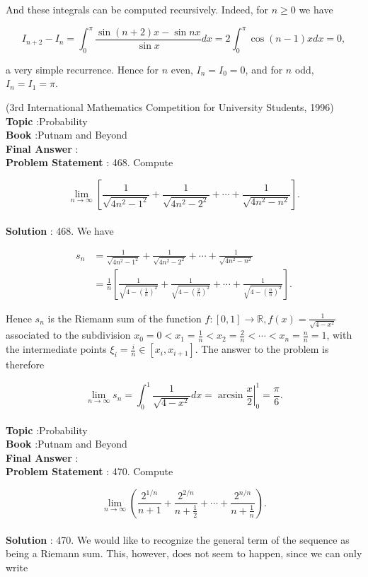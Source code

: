 \documentclass[10pt]{article}
\begin{document}
And these integrals can be computed recursively. Indeed, for $n \geq 0$ we have

$$
I_{n+2}-I_{n}=\int_{0}^{\pi} \frac{\sin (n+2) x-\sin n x}{\sin x} d x=2 \int_{0}^{\pi} \cos (n-1) x d x=0,
$$

a very simple recurrence. Hence for $n$ even, $I_{n}=I_{0}=0$, and for $n$ odd, $I_{n}=I_{1}=\pi$.

(3rd International Mathematics Competition for University Students, 1996) 
\\
\textbf{Topic} :Probability\\
\textbf{Book} :Putnam and Beyond\\
\textbf{Final Answer} :\\


\textbf{Problem Statement} :
468. Compute

$$
\lim _{n \rightarrow \infty}\left[\frac{1}{\sqrt{4 n^{2}-1^{2}}}+\frac{1}{\sqrt{4 n^{2}-2^{2}}}+\cdots+\frac{1}{\sqrt{4 n^{2}-n^{2}}}\right] .
$$
\\
\textbf{Solution} :
468. We have

$$
\begin{aligned}
s_{n} &=\frac{1}{\sqrt{4 n^{2}-1^{2}}}+\frac{1}{\sqrt{4 n^{2}-2^{2}}}+\cdots+\frac{1}{\sqrt{4 n^{2}-n^{2}}} \\
&=\frac{1}{n}\left[\frac{1}{\sqrt{4-\left(\frac{1}{n}\right)^{2}}}+\frac{1}{\sqrt{4-\left(\frac{2}{n}\right)^{2}}}+\cdots+\frac{1}{\sqrt{4-\left(\frac{n}{n}\right)^{2}}}\right] .
\end{aligned}
$$

Hence $s_{n}$ is the Riemann sum of the function $f:[0,1] \rightarrow \mathbb{R}, f(x)=\frac{1}{\sqrt{4-x^{2}}}$ associated to the subdivision $x_{0}=0<x_{1}=\frac{1}{n}<x_{2}=\frac{2}{n}<\cdots<x_{n}=\frac{n}{n}=1$, with the intermediate points $\xi_{i}=\frac{i}{n} \in\left[x_{i}, x_{i+1}\right]$. The answer to the problem is therefore

$$
\lim _{n \rightarrow \infty} s_{n}=\int_{0}^{1} \frac{1}{\sqrt{4-x^{2}}} d x=\left.\arcsin \frac{x}{2}\right|_{0} ^{1}=\frac{\pi}{6} .
$$
\\
\textbf{Topic} :Probability\\
\textbf{Book} :Putnam and Beyond\\
\textbf{Final Answer} :\\


\textbf{Problem Statement} :
470. Compute

$$
\lim _{n \rightarrow \infty}\left(\frac{2^{1 / n}}{n+1}+\frac{2^{2 / n}}{n+\frac{1}{2}}+\cdots+\frac{2^{n / n}}{n+\frac{1}{n}}\right) .
$$
\\
\textbf{Solution} :
470. We would like to recognize the general term of the sequence as being a Riemann sum. This, however, does not seem to happen, since we can only write
\end{document}
